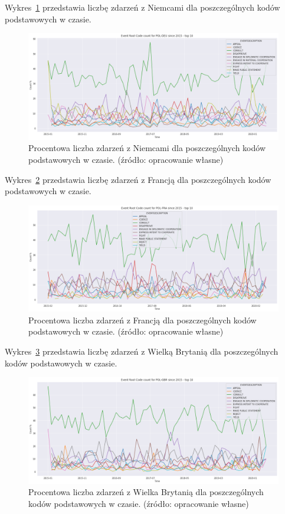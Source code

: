 \documentclass[11pt]{report}
\begin{document}
    Wykres~\ref{fig:PLDEUERC} przedstawia liczbę zdarzeń z Niemcami dla poszczególnych kodów podstawowych w czasie.
    \begin{figure}[!htp]
        \centering
        \includegraphics[width=1 \textwidth]{fig/PL/POLDEUERCperc.png}
        \caption{Procentowa liczba zdarzeń z Niemcami dla poszczególnych kodów podstawowych w czasie. (źródło: opracowanie własne)}
        \label{fig:PLDEUERC}
    \end{figure}

    Wykres~\ref{fig:PLFRAERC} przedstawia liczbę zdarzeń z Francją dla poszczególnych kodów podstawowych w czasie.
    \begin{figure}[!htp]
        \centering
        \includegraphics[width=1 \textwidth]{fig/PL/POLFRAERCperc.png}
        \caption{Procentowa liczba zdarzeń z Francją dla poszczególnych kodów podstawowych w czasie. (źródło: opracowanie własne)}
        \label{fig:PLFRAERC}
    \end{figure}

    Wykres~\ref{fig:PLGBRERC} przedstawia liczbę zdarzeń z Wielką Brytanią dla poszczególnych kodów podstawowych w czasie.
    \begin{figure}[!htp]
        \centering
        \includegraphics[width=1 \textwidth]{fig/PL/POLGBRERCperc.png}
        \caption{Procentowa liczba zdarzeń z Wielka Brytanią dla poszczególnych kodów podstawowych w czasie. (źródło: opracowanie własne)}
        \label{fig:PLGBRERC}
    \end{figure}
\end{document}
